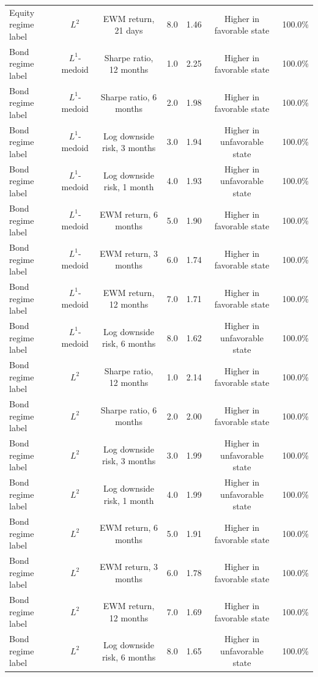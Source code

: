 \begin{table}
\begin{tabular}{lcccccc}
Equity regime label & \(L^2\) & EWM return, 21 days & 8.0 & 1.46 & Higher in favorable state & 100.0\% \\
Bond regime label & \(L^1\)-medoid & Sharpe ratio, 12 months & 1.0 & 2.25 & Higher in favorable state & 100.0\% \\
Bond regime label & \(L^1\)-medoid & Sharpe ratio, 6 months & 2.0 & 1.98 & Higher in favorable state & 100.0\% \\
Bond regime label & \(L^1\)-medoid & Log downside risk, 3 months & 3.0 & 1.94 & Higher in unfavorable state & 100.0\% \\
Bond regime label & \(L^1\)-medoid & Log downside risk, 1 month & 4.0 & 1.93 & Higher in unfavorable state & 100.0\% \\
Bond regime label & \(L^1\)-medoid & EWM return, 6 months & 5.0 & 1.90 & Higher in favorable state & 100.0\% \\
Bond regime label & \(L^1\)-medoid & EWM return, 3 months & 6.0 & 1.74 & Higher in favorable state & 100.0\% \\
Bond regime label & \(L^1\)-medoid & EWM return, 12 months & 7.0 & 1.71 & Higher in favorable state & 100.0\% \\
Bond regime label & \(L^1\)-medoid & Log downside risk, 6 months & 8.0 & 1.62 & Higher in unfavorable state & 100.0\% \\
Bond regime label & \(L^2\) & Sharpe ratio, 12 months & 1.0 & 2.14 & Higher in favorable state & 100.0\% \\
Bond regime label & \(L^2\) & Sharpe ratio, 6 months & 2.0 & 2.00 & Higher in favorable state & 100.0\% \\
Bond regime label & \(L^2\) & Log downside risk, 3 months & 3.0 & 1.99 & Higher in unfavorable state & 100.0\% \\
Bond regime label & \(L^2\) & Log downside risk, 1 month & 4.0 & 1.99 & Higher in unfavorable state & 100.0\% \\
Bond regime label & \(L^2\) & EWM return, 6 months & 5.0 & 1.91 & Higher in favorable state & 100.0\% \\
Bond regime label & \(L^2\) & EWM return, 3 months & 6.0 & 1.78 & Higher in favorable state & 100.0\% \\
Bond regime label & \(L^2\) & EWM return, 12 months & 7.0 & 1.69 & Higher in favorable state & 100.0\% \\
Bond regime label & \(L^2\) & Log downside risk, 6 months & 8.0 & 1.65 & Higher in unfavorable state & 100.0\% \\
\bottomrule
\end{tabular}
\end{table}
